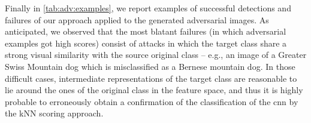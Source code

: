 Finally in \ref{tab:adv:examples}, we report examples of successful detections and failures of our approach applied to the generated adversarial images. %
As anticipated, we observed that the most blatant failures (in which adversarial examples got high scores) consist of attacks in which the target class share a strong visual similarity with the source original class -- e.g., an image of a Greater Swiss Mountain dog which is misclassified as a Bernese mountain dog.
In those difficult cases, intermediate representations of the target class are reasonable to lie around the ones of the original class in the feature space, and thus it is highly probable to erroneously obtain a confirmation of the classification of the \gls{cnn} by the kNN scoring approach.


